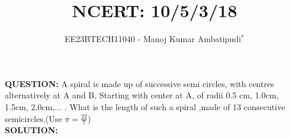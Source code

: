 \documentclass[journal,12pt,twocolumn]{IEEEtran}
\theoremstyle{remark}
\begin{document}

\vspace{3cm}
\title{NCERT: 10/5/3/18}
\author{EE23BTECH11040 - Manoj Kumar Ambatipudi$^{*}$%
}
\maketitle
\newpage
\bigskip
\renewcommand{\thefigure}{\theenumi}
\renewcommand{\thetable}{\theenumi}
\textbf{QUESTION:}
A spiral is made up of successive semi circles, with centres alternatively at A and B, Starting with center at A, of radii 0.5 cm, 1.0cm, 1.5cm, 2.0cm,... . What is the length of such a spiral ,made of 13 consecutive semicircles.(Use $\pi = \frac{22}{7}$) \\
\textbf{SOLUTION:}
\fi

\end{document}
